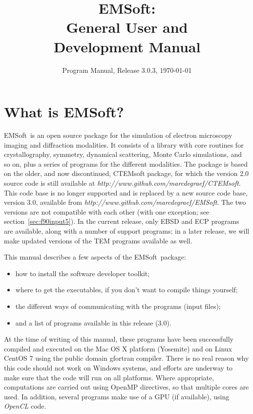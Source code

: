 \documentclass[DIV=calc, paper=letter, fontsize=11pt]{scrartcl}	 %
\title{EMSoft:\\ General User and\\ Development Manual} %
\author{\vspace*{-0.7in}} %
\date{Program Manual, Release 3.0.3, \today}
\newcommand{\ctp}{\textsf{EMSoft}}
\newcommand{\ctpb}{\textbf{\textsf{EMSoft}}}
\begin{document}
\maketitle

\renewcommand{\contentsname}{Table of Contents}
{\small\tableofcontents}

\newpage
\section{What is \ctpb?}
\ctp\ is an open source package for the simulation of electron microscopy imaging and diffraction modalities.  It consists of a library with
core routines for crystallography, symmetry, dynamical scattering, Monte Carlo simulations, and so on, plus a series of programs for the different modalities.
The package is based on the older, and now discontinued, \textsf{CTEMsoft} package, for which the version 2.0 source code is still
available at \textit{http://www.github.com/marcdegraef/CTEMsoft}.  This code base is no longer supported and is replaced
by a new source code base, version 3.0, available from \textit{http://www.github.com/marcdegraef/EMSoft}.  The two versions are not 
compatible with each other (with one exception; see section~\ref{sec:f90input5}).  In the current release, only EBSD and ECP programs are
available, along with a number of support programs; in a later release, we will make updated versions of the TEM programs available as well.

This manual describes a few aspects of the \ctp\ package:
\begin{itemize}
\item how to install the software developer toolkit;
\item where to get the executables, if you don't want to compile things yourself;
\item the different ways of communicating with the programs (input files);
\item and a list of programs available in this release (3.0).
\end{itemize}

At the time of writing of this manual, these programs have been successfully compiled and executed on the Mac OS X platform (Yosemite) and on 
Linux CentOS 7 using the public domain gfortran compiler. There is no real reason why this code should not work on Windows systems, and efforts are underway
to make sure that the code will run on all platforms. Where appropriate, computations
are carried out using \textsf{OpenMP} directives, so that multiple cores are used.  In addition, several programs make use of a 
GPU (if available), using \textit{OpenCL} code.
\end{document}
